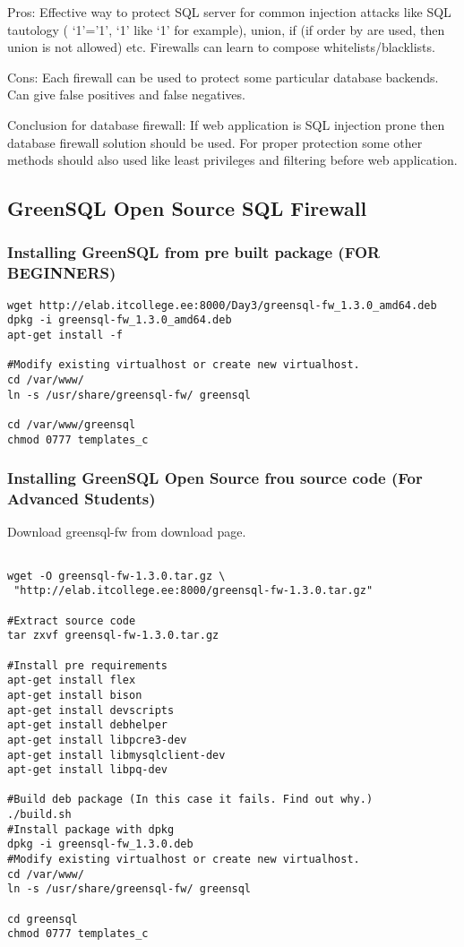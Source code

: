 Pros:
Effective way to protect SQL server for common injection attacks like SQL tautology ( ‘1’=’1’, ‘1’ like ‘1’ for example), union, if (if order by are used, then union is not allowed) etc.
Firewalls can learn to compose whitelists/blacklists.

Cons:
Each firewall can be used to protect some particular database backends.
Can give false positives and false negatives.

Conclusion for  database firewall:
If web application is SQL injection prone then database firewall solution should be used.
For proper protection some other methods should also used like least privileges and filtering before web application.

\subsection{GreenSQL Open Source SQL Firewall}
\subsubsection{Installing GreenSQL from pre built package (FOR BEGINNERS)}
\begin{verbatim}
wget http://elab.itcollege.ee:8000/Day3/greensql-fw_1.3.0_amd64.deb
dpkg -i greensql-fw_1.3.0_amd64.deb
apt-get install -f

#Modify existing virtualhost or create new virtualhost.
cd /var/www/
ln -s /usr/share/greensql-fw/ greensql

cd /var/www/greensql
chmod 0777 templates_c
\end{verbatim}

\subsubsection{Installing GreenSQL Open Source frou source code (For Advanced Students)}


Download greensql-fw from download page.
\begin{verbatim}

wget -O greensql-fw-1.3.0.tar.gz \
 "http://elab.itcollege.ee:8000/greensql-fw-1.3.0.tar.gz"

#Extract source code
tar zxvf greensql-fw-1.3.0.tar.gz

#Install pre requirements
apt-get install flex
apt-get install bison
apt-get install devscripts
apt-get install debhelper
apt-get install libpcre3-dev
apt-get install libmysqlclient-dev
apt-get install libpq-dev

#Build deb package (In this case it fails. Find out why.)
./build.sh
#Install package with dpkg
dpkg -i greensql-fw_1.3.0.deb
#Modify existing virtualhost or create new virtualhost.
cd /var/www/
ln -s /usr/share/greensql-fw/ greensql

cd greensql
chmod 0777 templates_c
\end{verbatim}

